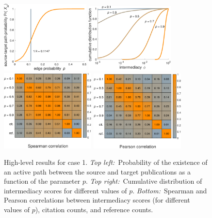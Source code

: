 \documentclass{article}
\theoremstyle{definition}
\begin{document}
\begin{figure}[t]
  \centering%
  \includegraphics[width=0.4\textwidth]{phist_Q}\linewidth
  \includegraphics[width=0.4\textwidth]{distributions_Q}\\\linewidth
  \includegraphics[width=0.425\textwidth]{spearman_Q}\linewidth
  \includegraphics[width=0.425\textwidth]{pearson_Q}
  \caption{High-level results for case 1. \emph{Top left:}~Probability of the existence of an active path between the source and target publications as a function of the parameter $p$. \emph{Top right:}~Cumulative distribution of intermediacy scores for different values of $p$. \emph{Bottom:}~Spearman and Pearson correlations between intermediacy scores (for different values of $p$), citation counts, and reference counts.}
  \label{fig:Q}
\end{figure}
\end{document}
